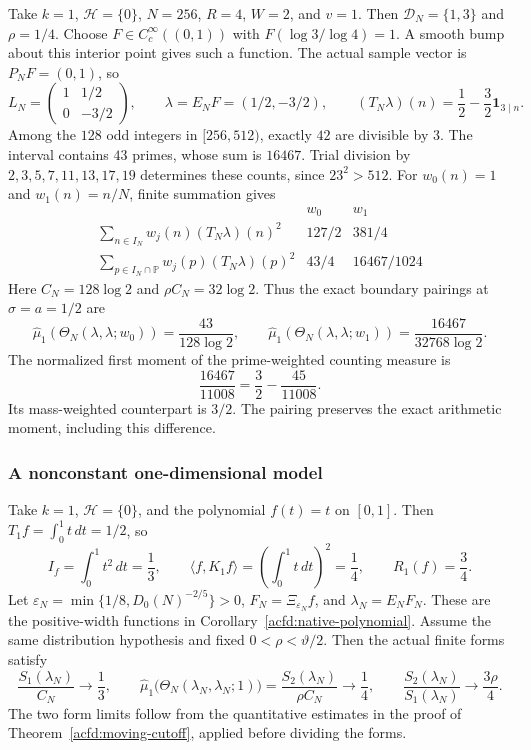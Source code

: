 Take $k=1$, $\mathcal H=\{0\}$, $N=256$, $R=4$, $W=2$, and $v=1$.
Then $\mathcal D_N=\{1,3\}$ and $\rho=1/4$.
Choose $F\in C_c^\infty((0,1))$ with
$F(\log3/\log4)=1$.
A smooth bump about this interior point gives such a function.
The actual sample vector is $P_NF=(0,1)$, so
\[
 L_N=\begin{pmatrix}1&1/2\\0&-3/2\end{pmatrix},\qquad
 \lambda=E_NF=(1/2,-3/2),\qquad
 (T_N\lambda)(n)=\frac12-\frac32\mathbf1_{3\mid n}.
\]
Among the $128$ odd integers in $[256,512)$, exactly $42$ are divisible by $3$.
The interval contains $43$ primes, whose sum is $16467$.
Trial division by $2,3,5,7,11,13,17,19$ determines these counts,
since $23^2>512$.
For $w_0(n)=1$ and $w_1(n)=n/N$, finite summation gives
\[
\begin{array}{c|cc}
 & w_0 & w_1\\\hline
 \displaystyle\sum_{n\in I_N}w_j(n)(T_N\lambda)(n)^2
       &127/2&381/4\\[1mm]
 \displaystyle\sum_{p\in I_N\cap\mathbb P}w_j(p)(T_N\lambda)(p)^2
       &43/4&16467/1024
\end{array}
\]
Here $C_N=128\log2$ and $\rho C_N=32\log2$.
Thus the exact boundary pairings at $\sigma=a=1/2$ are
\begin{equation}\label{acfp:finite-moment}
 \widehat\mu_1(\Theta_N(\lambda,\lambda;w_0))
       =\frac{43}{128\log2},\qquad
 \widehat\mu_1(\Theta_N(\lambda,\lambda;w_1))
       =\frac{16467}{32768\log2}.
\end{equation}
The normalized first moment of the prime-weighted counting measure is
\[
 \frac{16467}{11008}=\frac32-\frac{45}{11008}.
\]
Its mass-weighted counterpart is $3/2$.
The pairing preserves the exact arithmetic moment, including this difference.

\subsubsection{A nonconstant one-dimensional model}

Take $k=1$, $\mathcal H=\{0\}$, and the polynomial $f(t)=t$ on $[0,1]$.
Then $T_1f=\int_0^1t\,dt=1/2$, so
\begin{equation}\label{acfp:linear-model}
 I_f=\int_0^1t^2\,dt=\frac13,\qquad
 \langle f,K_1f\rangle=\left(\int_0^1t\,dt\right)^2=\frac14,
 \qquad R_1(f)=\frac34.
\end{equation}
Let
$\varepsilon_N=\min\{1/8,D_0(N)^{-2/5}\}>0$,
$F_N=\Xi_{\varepsilon_N}f$, and $\lambda_N=E_NF_N$.
These are the positive-width functions in Corollary~\ref{acfd:native-polynomial}.
Assume the same distribution hypothesis and fixed $0<\rho<\vartheta/2$.
Then the actual finite forms satisfy
\begin{equation}\label{acfp:linear-limits}
 \frac{S_1(\lambda_N)}{C_N}\longrightarrow\frac13,\qquad
 \widehat\mu_1\bigl(\Theta_N(\lambda_N,\lambda_N;1)\bigr)
       =\frac{S_2(\lambda_N)}{\rho C_N}\longrightarrow\frac14,
 \qquad
 \frac{S_2(\lambda_N)}{S_1(\lambda_N)}\longrightarrow\frac{3\rho}4.
\end{equation}
The two form limits follow from the quantitative estimates in the proof
of Theorem~\ref{acfd:moving-cutoff}, applied before dividing the forms.

